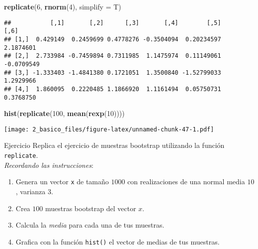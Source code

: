 \documentclass[]{article}
\newenvironment{Shaded}{\begin{snugshade}}{\end{snugshade}}
\newcommand{\KeywordTok}[1]{\textcolor[rgb]{0.13,0.29,0.53}{\textbf{{#1}}}}
\newcommand{\DataTypeTok}[1]{\textcolor[rgb]{0.13,0.29,0.53}{{#1}}}
\newcommand{\DecValTok}[1]{\textcolor[rgb]{0.00,0.00,0.81}{{#1}}}
\newcommand{\NormalTok}[1]{{#1}}
\begin{document}
\begin{Shaded}
\begin{Highlighting}[]
\KeywordTok{replicate}\NormalTok{(}\DecValTok{6}\NormalTok{, }\KeywordTok{rnorm}\NormalTok{(}\DecValTok{4}\NormalTok{), }\DataTypeTok{simplify =} \NormalTok{T)}
\end{Highlighting}
\end{Shaded}

\begin{verbatim}
##           [,1]       [,2]      [,3]       [,4]        [,5]       [,6]
## [1,]  0.429149  0.2459699 0.4778276 -0.3504094  0.20234597  2.1874601
## [2,]  2.733984 -0.7459894 0.7311985  1.1475974  0.11149061 -0.0709549
## [3,] -1.333403 -1.4841380 0.1721051  1.3500840 -1.52799033  1.2929966
## [4,]  1.860095  0.2220485 1.1866920  1.1161494  0.05750731  0.3768750
\end{verbatim}

\begin{Shaded}
\begin{Highlighting}[]
\KeywordTok{hist}\NormalTok{(}\KeywordTok{replicate}\NormalTok{(}\DecValTok{100}\NormalTok{, }\KeywordTok{mean}\NormalTok{(}\KeywordTok{rexp}\NormalTok{(}\DecValTok{10}\NormalTok{))))}
\end{Highlighting}
\end{Shaded}

\texttt{[image: 2\_basico\_files/figure-latex/unnamed-chunk-47-1.pdf]}

\renewcommand\bcStyleTitre[1]{\large\textcolor{bbblack}{#1}}

\begin{bclogo}[
  couleur=llred,
  arrondi=0,
  logo=\bcstop,
  barre=none,
  noborder=true]{Ejercicio}
Replica el ejercicio de muestras bootstrap utilizando la función \texttt{replicate}.\\

\textit{Recordando las instrucciones}:

\begin{enumerate}
\item Genera un vector \texttt{x} de tamaño $1000$ con realizaciones de una normal media $10$, varianza $3$. 
\item Crea $100$ muestras bootstrap del vector $x$.
\item Calcula la \textit{media} para cada una de tus muestras.
\item Grafica con la función \texttt{hist()} el vector de medias de tus muestras.
\end{enumerate}

\end{bclogo}
\end{document}
